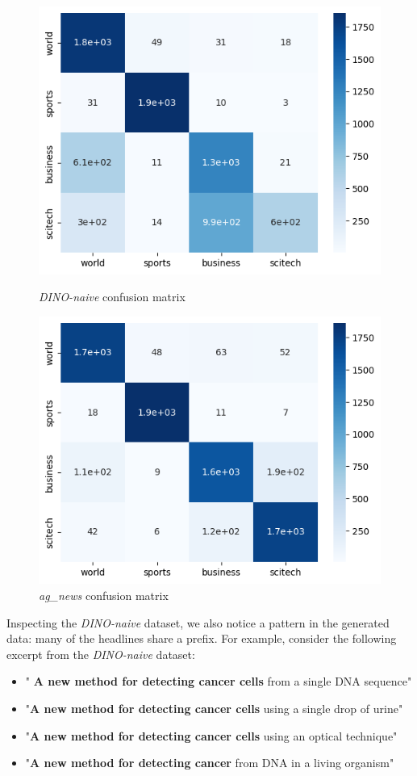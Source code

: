 \documentclass[11pt]{article}
\begin{document}
\begin{figure}[h]
    \centering
    \includegraphics[width=0.8\linewidth]{cm_naive.png}
    \caption{\textit{DINO-naive} confusion matrix}
    \label{fig:confusion1}
    \includegraphics[width=0.8\linewidth]{cm_real.png}
    \caption{\textit{ag\_news} confusion matrix}
    \label{fig:confusion2}
\end{figure}

Inspecting the \textit{DINO-naive} dataset, we also notice a pattern in the generated data: many of the headlines share a prefix. For example, consider the following excerpt from the \textit{DINO-naive} dataset:
\begin{itemize}
    \item " \textbf{A new method for detecting cancer cells} from a single DNA sequence"
    \item "\textbf{A new method for detecting cancer cells} using a single drop of urine"
    \item "\textbf{A new method for detecting cancer cells} using an optical technique"
    \item "\textbf{A new method for detecting cancer} from DNA in a living organism"
\end{itemize}
\end{document}
